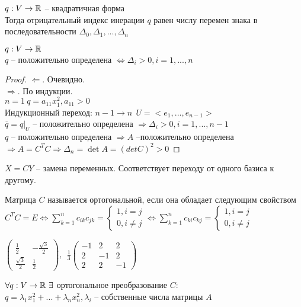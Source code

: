 \begin{Cons}
	$q: V \to \mathbb{R}$ -- квадратичная форма\\
	Тогда отрицательный индекс инерации $q$ равен числу перемен знака в последовательности $\Delta_0, \Delta_1, ..., \Delta_n$ 
\end{Cons}

\begin{Thm} 
	$q: V \to \mathbb{R}$\\
	$q$ -- положительно  определена $\Leftrightarrow \Delta_i > 0, i = 1,...,n$
\end{Thm} 

\begin{proof}
	$\Leftarrow.$ Очевидно.\\
	$\Rightarrow$. По индукции.\\
	$n=1 \ q = a_{11}x^2_1, a_{11} > 0$\\
	Индукционный переход: $n-1 \to n \ \ U = <e_1, ..., e_{n-1}>$\\
	$\overline{q} = q \big|_U$ -- положительно определена $\Rightarrow \Delta_i > 0, i = 1, ..., n-1$\\
	$q$ -- положительно определена $\Rightarrow A$ --положительно определена $\Rightarrow A = C^TC \Rightarrow \Delta_n = \det A = (det C)^2 > 0$ 
\end{proof}

\begin{Def} 
	$X = CY$ -- замена переменных. Соответствует переходу от одного базиса к другому. 
\end{Def} 

\begin{Def} 
	Матрица $C$ называется ортогональной, если она обладает следующим свойством $C^TC=E \Leftrightarrow \sum_{k=1}^{n} c_{ik} c_{jk} = \begin{cases}
		1, i = j\\
		0, i \neq j
	\end{cases} \Leftrightarrow \sum_{k=1}^{n} c_{ki}c_{kj} = \begin{cases}
		1, i = j\\
		0, i \neq j
	\end{cases}$
\end{Def} 

\begin{Example}
	$\left(\begin{array}{cc}
		\frac{1}{2} & -\frac{\sqrt{3}}{2}\\
		\frac{\sqrt{3}}{2} & \frac{1}{2}
	\end{array} \right), \ \
	\frac{1}{3} \left(
	\begin{array}{ccc}
		-1 & 2 & 2\\
		2 & -1 & 2\\ 
		2 & 2 & -1
	\end{array} \right)$
\end{Example}

\begin{Thm} 
	$\forall q: V \to \mathbb{R} \ \exists$ ортогональное преобразование $C:$\\
	$q = \lambda_1 x_1^2 + ... + \lambda_n x_n^2, \lambda_i$ -- собственные числа матрицы $A$
\end{Thm} 

